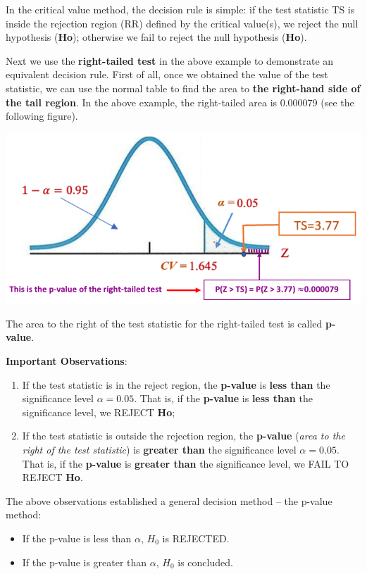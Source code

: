 \documentclass[
]{book}
\providecommand{\tightlist}{%
  \setlength{\itemsep}{0pt}\setlength{\parskip}{0pt}}
\begin{document}
In the critical value method, the decision rule is simple: if the test statistic TS is inside the rejection region (RR) defined by the critical value(s), we reject the null hypothesis (\textbf{Ho}); otherwise we fail to reject the null hypothesis (\textbf{Ho}).

Next we use the \textbf{right-tailed test} in the above example to demonstrate an equivalent decision rule. First of all, once we obtained the value of the test statistic, we can use the normal table to find the area to \textbf{the right-hand side of the tail region}. In the above example, the right-tailed area is 0.000079 (see the following figure).

\begin{center}\includegraphics[width=0.5\linewidth]{week09/definitionPValue} \end{center}

The area to the right of the test statistic for the right-tailed test is called \textbf{p-value}.

\textbf{Important Observations}:

\begin{enumerate}
\def\labelenumi{\arabic{enumi}.}
\item
  If the test statistic is in the reject region, the \textbf{p-value} is \textbf{less than} the significance level \(\alpha = 0.05\). That is, if the \textbf{p-value} is \textbf{less than} the significance level, we REJECT \textbf{Ho};
\item
  If the test statistic is outside the rejection region, the \textbf{p-value} (\emph{area to the right of the test statistic}) is \textbf{greater than} the significance level \(\alpha = 0.05\). That is, if the \textbf{p-value} is \textbf{greater than} the significance level, we FAIL TO REJECT \textbf{Ho}.
\end{enumerate}

The above observations established a general decision method -- the p-value method:

\begin{itemize}
\tightlist
\item
  If the p-value is less than \(\alpha\), \(H_0\) is REJECTED.
\item
  If the p-value is greater than \(\alpha\), \(H_0\) is concluded.
\end{itemize}
\end{document}
